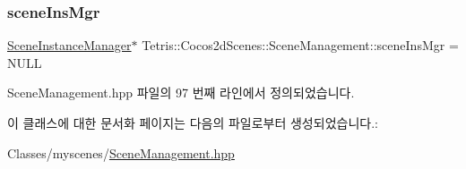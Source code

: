\subsubsection{\texorpdfstring{scene\+Ins\+Mgr}{sceneInsMgr}}
{\footnotesize\ttfamily \hyperlink{class_tetris_1_1_cocos2d_scenes_1_1_scene_instance_manager}{Scene\+Instance\+Manager}$\ast$ Tetris\+::\+Cocos2d\+Scenes\+::\+Scene\+Management\+::scene\+Ins\+Mgr = N\+U\+LL\hspace{0.3cm}{\ttfamily [protected]}}



Scene\+Management.\+hpp 파일의 97 번째 라인에서 정의되었습니다.



이 클래스에 대한 문서화 페이지는 다음의 파일로부터 생성되었습니다.\+:\begin{DoxyCompactItemize}
\item 
Classes/myscenes/\hyperlink{_scene_management_8hpp}{Scene\+Management.\+hpp}\end{DoxyCompactItemize}
